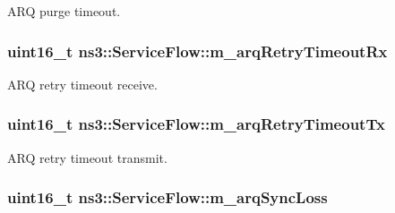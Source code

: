 A\+RQ purge timeout. 

\subsubsection[{\texorpdfstring{m\+\_\+arq\+Retry\+Timeout\+Rx}{m_arqRetryTimeoutRx}}]{\setlength{\rightskip}{0pt plus 5cm}uint16\+\_\+t ns3\+::\+Service\+Flow\+::m\+\_\+arq\+Retry\+Timeout\+Rx\hspace{0.3cm}{\ttfamily [private]}}\hypertarget{classns3_1_1ServiceFlow_acdaa53c3298bc50b58a06b30dabb33d2}{}\label{classns3_1_1ServiceFlow_acdaa53c3298bc50b58a06b30dabb33d2}


A\+RQ retry timeout receive. 

\subsubsection[{\texorpdfstring{m\+\_\+arq\+Retry\+Timeout\+Tx}{m_arqRetryTimeoutTx}}]{\setlength{\rightskip}{0pt plus 5cm}uint16\+\_\+t ns3\+::\+Service\+Flow\+::m\+\_\+arq\+Retry\+Timeout\+Tx\hspace{0.3cm}{\ttfamily [private]}}\hypertarget{classns3_1_1ServiceFlow_a4ec13b36ebe74498e5556ad162f001f0}{}\label{classns3_1_1ServiceFlow_a4ec13b36ebe74498e5556ad162f001f0}


A\+RQ retry timeout transmit. 

\subsubsection[{\texorpdfstring{m\+\_\+arq\+Sync\+Loss}{m_arqSyncLoss}}]{\setlength{\rightskip}{0pt plus 5cm}uint16\+\_\+t ns3\+::\+Service\+Flow\+::m\+\_\+arq\+Sync\+Loss\hspace{0.3cm}{\ttfamily [private]}}\hypertarget{classns3_1_1ServiceFlow_a7a2d8589e71ab594cc962e9bc6192ef1}{}\label{classns3_1_1ServiceFlow_a7a2d8589e71ab594cc962e9bc6192ef1}


